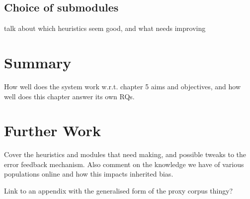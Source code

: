 \subsection{Choice of submodules}
talk about which heuristics seem good, and what needs improving


\section{Summary}
How well does the system work w.r.t. chapter 5 aims and objectives, and how well does this chapter 
answer its own RQs.


\section{Further Work}
\label{sec:evaluation:furtherwork}
Cover the heuristics and modules that need making, and possible tweaks to the error feedback mechanism.  Also comment on the knowledge we have of various populations online and how this impacts inherited bias.

Link to an appendix with the generalised form of the proxy corpus thingy?
